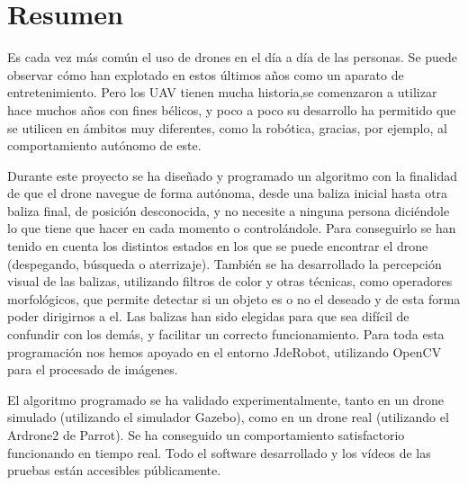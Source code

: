 \chapter*{Resumen}
\hspace{1cm} Es cada vez m\'as com\'un el uso de drones en el d\'ia a d\'ia de las personas. Se puede observar c\'omo han explotado en estos \'ultimos años como un aparato de entretenimiento. Pero los UAV tienen mucha historia,se comenzaron a utilizar hace muchos años con fines b\'elicos, y poco a poco su desarrollo ha permitido que se utilicen en \'ambitos muy diferentes, como la rob\'otica, gracias, por ejemplo, al comportamiento aut\'onomo de este.

\hspace{1cm} Durante este proyecto se ha diseñado y programado un algoritmo con la finalidad de que el drone navegue de forma aut\'onoma, desde una baliza inicial hasta otra baliza final, de posici\'on desconocida, y no necesite a ninguna persona dici\'endole lo que tiene que hacer en cada momento o control\'andole. Para conseguirlo se han tenido en cuenta los distintos estados en los que se puede encontrar el drone (despegando, b\'usqueda o aterrizaje).
Tambi\'en se ha desarrollado la percepci\'on visual de las balizas, utilizando filtros de color y otras t\'ecnicas, como operadores morfol\'ogicos, que permite detectar si un objeto es o no el deseado y de esta forma poder dirigirnos a el. Las balizas han sido elegidas para que sea dif\'icil de confundir con los dem\'as, y facilitar un correcto funcionamiento. Para toda esta programaci\'on nos hemos apoyado en el entorno JdeRobot, utilizando OpenCV para el procesado de im\'agenes.

\hspace{1cm} El algoritmo programado se ha validado experimentalmente, tanto en un drone simulado (utilizando el simulador Gazebo), como en un drone real (utilizando el Ardrone2 de Parrot). Se ha conseguido un comportamiento satisfactorio funcionando en tiempo real. Todo el software desarrollado y los v\'ideos de las pruebas est\'an accesibles p\'ublicamente. 


